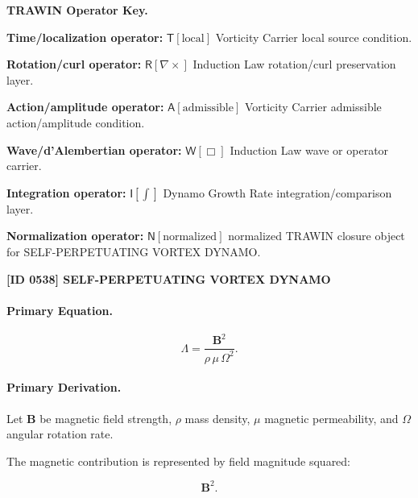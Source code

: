 \par\vspace{0.45\baselineskip}
\noindent\begin{minipage}[t]{\linewidth}
\begingroup
\small
\raggedright
\textbf{TRAWIN Operator Key.}\par
\noindent\textbf{Time/localization operator:} $\mathsf{T}\!\left[\mathrm{local}\right]$ Vorticity Carrier local source condition.\par
\noindent\textbf{Rotation/curl operator:} $\mathsf{R}\!\left[\nabla\times\right]$ Induction Law rotation/curl preservation layer.\par
\noindent\textbf{Action/amplitude operator:} $\mathsf{A}\!\left[\mathrm{admissible}\right]$ Vorticity Carrier admissible action/amplitude condition.\par
\noindent\textbf{Wave/d'Alembertian operator:} $\mathsf{W}\!\left[\Box\right]$ Induction Law wave or operator carrier.\par
\noindent\textbf{Integration operator:} $\mathsf{I}\!\left[\int\right]$ Dynamo Growth Rate integration/comparison layer.\par
\noindent\textbf{Normalization operator:} $\mathsf{N}\!\left[\mathrm{normalized}\right]$ normalized TRAWIN closure object for SELF-PERPETUATING VORTEX DYNAMO.\par
\endgroup
\end{minipage}

\clearpage
\noindent\textbf{[ID 0538] SELF-PERPETUATING VORTEX DYNAMO}\par
\vspace{0.35em}
\paragraph{Primary Equation.}
\begin{equation}
\Lambda
=
\frac{\mathbf{B}^2}
{\rho\,\mu\,\Omega^2}.
\end{equation}

\paragraph{Primary Derivation.}
Let $\mathbf{B}$ be magnetic field strength, $\rho$ mass density, $\mu$ magnetic permeability, and $\Omega$ angular rotation rate.

The magnetic contribution is represented by field magnitude squared:

\begin{equation}
\mathbf{B}^2 .
\end{equation}


